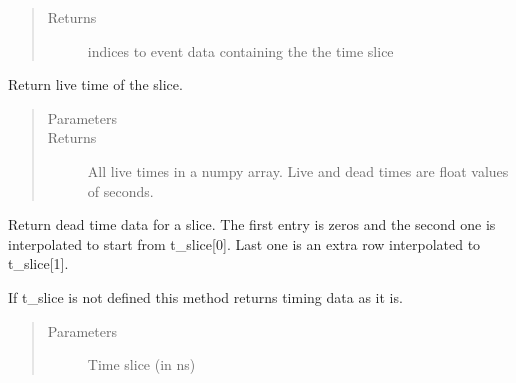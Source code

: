 \documentclass[letterpaper,10pt,english]{sphinxmanual}
\begin{document}
\begin{fulllineitems}
\begin{fulllineitems}
\begin{quote}
\begin{description}
\item[{Returns}] \leavevmode
\sphinxAtStartPar
indices to event data containing the the time slice

\end{description}\end{quote}

\end{fulllineitems}


\begin{fulllineitems}
\label{\detokenize{autodocs/data:listmode.data.TimeCache.get_live_time}}
\sphinxAtStartPar
Return live time of the slice.
\begin{quote}\begin{description}
\item[{Parameters}] \leavevmode
\sphinxAtStartPar
{} \textendash{} 

\item[{Returns}] \leavevmode
\sphinxAtStartPar
All live times in a numpy array. Live and dead times are float values of seconds.

\end{description}\end{quote}

\end{fulllineitems}


\begin{fulllineitems}
\label{\detokenize{autodocs/data:listmode.data.TimeCache.get_timing}}
\sphinxAtStartPar
Return dead time data for a slice. The first entry is zeros and the second one is interpolated to start
from t\_slice{[}0{]}. Last one is an extra row interpolated to t\_slice{[}1{]}.

\sphinxAtStartPar
If t\_slice is not defined this method returns timing data as it is.
\begin{quote}\begin{description}
\item[{Parameters}] \leavevmode
\sphinxAtStartPar
{} \textendash{} Time slice (in ns)


\end{description}
\end{quote}
\end{fulllineitems}
\end{fulllineitems}
\end{document}
